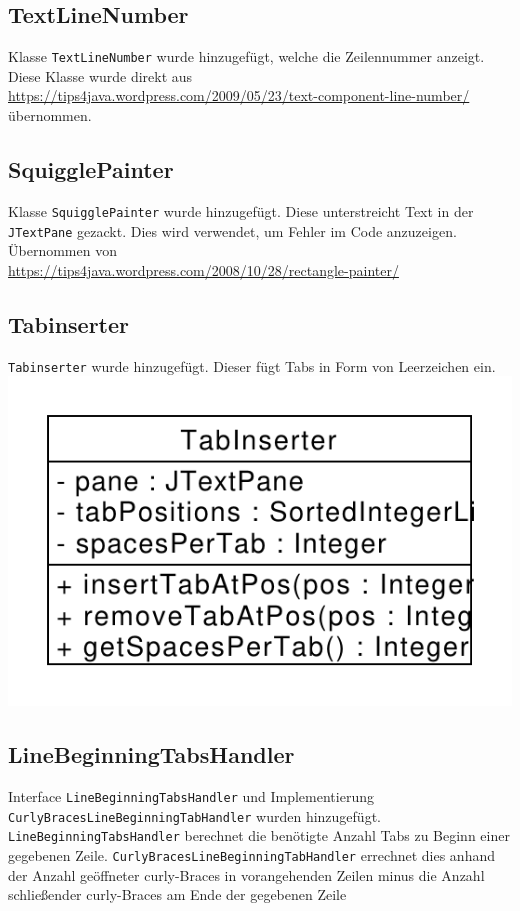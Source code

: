 \documentclass[a4paper]{scrreprt}
\begin{document}
\subsection{TextLineNumber}
Klasse \verb!TextLineNumber! wurde hinzugefügt, welche die Zeilennummer anzeigt. Diese Klasse wurde direkt aus\\ \url{https://tips4java.wordpress.com/2009/05/23/text-component-line-number/}\\ übernommen.\\
\subsection{SquigglePainter}
Klasse \verb!SquigglePainter! wurde hinzugefügt. Diese unterstreicht Text in der \verb!JTextPane! gezackt. Dies wird verwendet, um Fehler im Code anzuzeigen. Übernommen von\\
\url{https://tips4java.wordpress.com/2008/10/28/rectangle-painter/}\\
\subsection{Tabinserter}
\verb!Tabinserter! wurde hinzugefügt. Dieser fügt Tabs in Form von Leerzeichen ein.\\
\includegraphics[scale=0.5]{TabInserter.pdf}\\
\subsection{LineBeginningTabsHandler}
Interface \verb!LineBeginningTabsHandler! und Implementierung \\ \verb!CurlyBracesLineBeginningTabHandler! wurden hinzugefügt.\\ \verb!LineBeginningTabsHandler! berechnet die benötigte Anzahl Tabs zu Beginn einer gegebenen Zeile. \verb!CurlyBracesLineBeginningTabHandler! errechnet dies anhand der Anzahl geöffneter curly-Braces in vorangehenden Zeilen minus die Anzahl schließender curly-Braces am Ende der gegebenen Zeile\\
\end{document}
